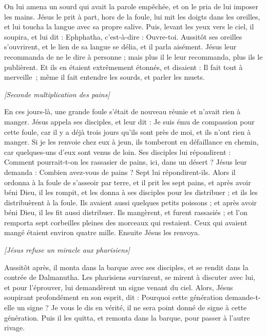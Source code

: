 \begin{multicols}{2}
On lui amena un sourd qui avait la parole empêchée, et on le pria de lui imposer les mains.
Jésus le prit à part, hors de la foule, lui mit les doigts dans les oreilles, et lui toucha la langue avec sa propre salive.
Puis, levant les yeux vers le ciel, il soupira, et lui dit : Ephphatha, c'est-à-dire : Ouvre-toi.
Aussitôt ses oreilles s'ouvrirent, et le lien de sa langue se délia, et il parla aisément.
Jésus leur recommanda de ne le dire à personne ; mais plus il le leur recommanda, plus ils le publièrent.
Et ils en étaient extrêmement étonnés, et disaient : Il fait tout à merveille ; même il fait entendre les sourds, et parler les muets.
\begin{center}
\textit{[Seconde multiplication des pains]}
\end{center}
\VerseOne{}En ces jours-là, une grande foule s’était de nouveau réunie et n’avait rien à manger. Jésus appela ses disciples, et leur dit :
Je suis ému de compassion pour cette foule, car il y a déjà trois jours qu'ils sont près de moi, et ils n'ont rien à manger.
Si je les renvoie chez eux à jeun, ils tomberont en défaillance en chemin, car quelques-uns d'eux sont venus de loin.
Ses disciples lui répondirent : Comment pourrait-t-on les rassasier de pains, ici, dans un désert ?
Jésus leur demanda : Combien avez-vous de pains ? Sept lui répondirent-ils.
Alors il ordonna à la foule de s'asseoir par terre, et il prit les sept pains, et après avoir béni Dieu, il les rompit, et les donna à ses disciples pour les distribuer ; et ils les distribuèrent à la foule.
Ils avaient aussi quelques petits poissons ; et après avoir béni Dieu, il les fit aussi distribuer.
Ils mangèrent, et furent rassasiés ; et l’on remporta sept corbeilles pleines des morceaux qui restaient.
Ceux qui avaient mangé étaient environ quatre mille. Ensuite Jésus les renvoya.
\begin{center}
\textit{[Jésus refuse un miracle aux pharisiens]}
\end{center}
\PPE{}
Aussitôt après, il monta dans la barque avec ses disciples, et se rendit dans la contrée de Dalmanutha.
Les pharisiens survinrent, se mirent à discuter avec lui, et pour l'éprouver, lui demandèrent un signe venant du ciel.
Alors, Jésus soupirant profondément en son esprit, dit : Pourquoi cette génération demande-t-elle un signe ? Je vous le dis en vérité, il ne sera point donné de signe à cette génération.
Puis il les quitta, et remonta dans la barque, pour passer à l'autre rivage.

\end{multicols}
